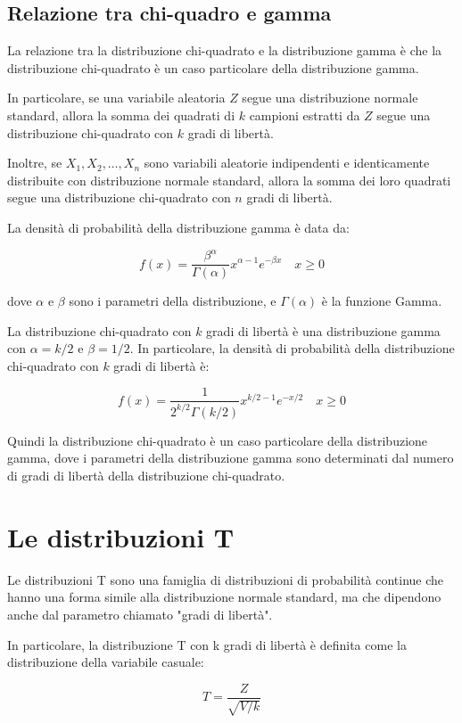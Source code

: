 \subsection{Relazione tra chi-quadro e gamma}
La relazione tra la distribuzione chi-quadrato e la distribuzione gamma è che la distribuzione chi-quadrato è un caso particolare della distribuzione gamma.

In particolare, se una variabile aleatoria $Z$ segue una distribuzione normale standard, allora la somma dei quadrati di $k$ campioni estratti da $Z$ segue una distribuzione chi-quadrato con $k$ gradi di libertà.

Inoltre, se $X_1, X_2, \ldots, X_n$ sono variabili aleatorie indipendenti e identicamente distribuite con distribuzione normale standard, allora la somma dei loro quadrati segue una distribuzione chi-quadrato con $n$ gradi di libertà.

La densità di probabilità della distribuzione gamma è data da:

$$
f(x) = \frac{\beta^\alpha}{\Gamma(\alpha)} x^{\alpha-1} e^{-\beta x} \quad x \geq 0
$$

dove $\alpha$ e $\beta$ sono i parametri della distribuzione, e $\Gamma(\alpha)$ è la funzione Gamma.

La distribuzione chi-quadrato con $k$ gradi di libertà è una distribuzione gamma con $\alpha = k/2$ e $\beta = 1/2$. In particolare, la densità di probabilità della distribuzione chi-quadrato con $k$ gradi di libertà è:

$$
f(x) = \frac{1}{2^{k/2} \Gamma(k/2)} x^{k/2-1} e^{-x/2} \quad x \geq 0
$$

Quindi la distribuzione chi-quadrato è un caso particolare della distribuzione gamma, dove i parametri della distribuzione gamma sono determinati dal numero di gradi di libertà della distribuzione chi-quadrato.


\section{Le distribuzioni T}
Le distribuzioni T sono una famiglia di distribuzioni di probabilità continue che hanno una forma simile alla distribuzione normale standard, ma che dipendono anche dal parametro chiamato "gradi di libertà". 

In particolare, la distribuzione T con k gradi di libertà è definita come la distribuzione della variabile casuale:

$$ T = \frac{Z}{\sqrt{V/k}} $$

